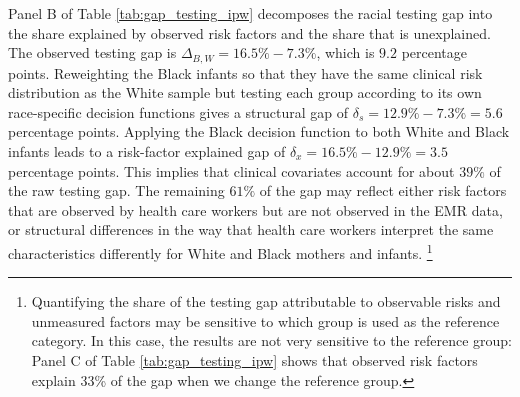 Panel B of Table \ref{tab:gap_testing_ipw} decomposes the racial testing gap into the share explained by observed risk factors and the share that is unexplained. The observed testing gap is $\Delta_{B,W} = 16.5\% - 7.3\%$, which is $9.2$ percentage points. Reweighting the Black infants so that they have the same clinical risk distribution as the White sample but testing each group according to its own race-specific decision functions gives a structural gap of $\delta_s = 12.9\% - 7.3\% = 5.6$ percentage points. Applying the Black decision function to both White and Black infants leads to a risk-factor explained gap of $\delta_x = 16.5\% - 12.9\% = 3.5$ percentage points. This implies that clinical covariates account for about $39\%$ of the raw testing gap. The remaining $61\%$ of the gap may reflect either risk factors that are observed by health care workers but are not observed in the EMR data, or structural differences in the way that health care workers interpret the same characteristics differently for White and Black mothers and infants. \footnote{Quantifying the share of the testing gap attributable to observable risks and unmeasured factors may be sensitive to which group is used as the reference category. In this case, the results are not very sensitive to the reference group: Panel C of Table \ref{tab:gap_testing_ipw} shows that observed risk factors explain 33\% of the gap when we change the reference group.}